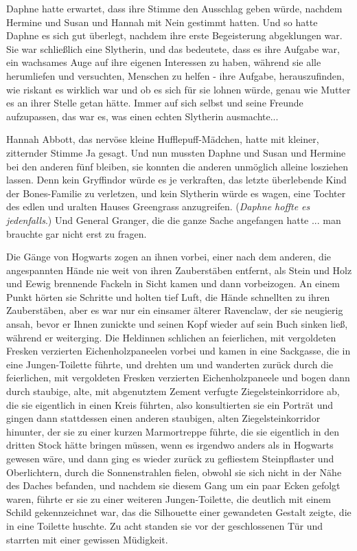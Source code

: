 Daphne hatte erwartet, dass ihre Stimme den Ausschlag geben würde, nachdem
Hermine und Susan und Hannah mit Nein gestimmt hatten. Und so hatte Daphne es
sich gut überlegt, nachdem ihre erste Begeisterung abgeklungen war. Sie war
schließlich eine Slytherin, und das bedeutete, dass es ihre Aufgabe war, ein
wachsames Auge auf ihre eigenen Interessen zu haben, während sie alle
herumliefen und versuchten, Menschen zu helfen - ihre Aufgabe, herauszufinden,
wie riskant es wirklich war und ob es sich für sie lohnen würde, genau wie
Mutter es an ihrer Stelle getan hätte. Immer auf sich selbst und seine Freunde
aufzupassen, das war es, was einen echten Slytherin ausmachte...

Hannah Abbott, das nervöse kleine Hufflepuff-Mädchen, hatte mit kleiner,
zitternder Stimme \glqq{}Ja\grqq{} gesagt. Und nun mussten Daphne und Susan und
Hermine bei den anderen fünf bleiben, sie konnten die anderen unmöglich alleine
losziehen lassen. Denn kein Gryffindor würde es je verkraften, das letzte
überlebende Kind der Bones-Familie zu verletzen, und kein Slytherin würde es
wagen, eine Tochter des edlen und uralten Hauses Greengrass anzugreifen.
(\emph{Daphne hoffte es jedenfalls}.) Und General Granger, die die ganze Sache
angefangen hatte ... man brauchte gar nicht erst zu fragen.

Die Gänge von Hogwarts zogen an ihnen vorbei, einer nach dem anderen, die
angespannten Hände nie weit von ihren Zauberstäben entfernt, als Stein und Holz
und Eewig brennende Fackeln in Sicht kamen und dann vorbeizogen. An einem Punkt
hörten sie Schritte und holten tief Luft, die Hände schnellten zu ihren
Zauberstäben, aber es war nur ein einsamer älterer Ravenclaw, der sie neugierig
ansah, bevor er Ihnen zunickte und seinen Kopf wieder auf sein Buch sinken ließ,
während er weiterging. Die Heldinnen schlichen an feierlichen, mit vergoldeten
Fresken verzierten Eichenholzpaneelen vorbei und kamen in eine Sackgasse, die in
eine Jungen-Toilette führte, und drehten um und wanderten zurück durch die
feierlichen, mit vergoldeten Fresken verzierten Eichenholzpaneele und bogen dann
durch staubige, alte, mit abgenutztem Zement verfugte Ziegelsteinkorridore ab,
die sie eigentlich in einen Kreis führten, also konsultierten sie ein Porträt
und gingen dann stattdessen einen anderen staubigen, alten Ziegelsteinkorridor
hinunter, der sie zu einer kurzen Marmortreppe führte, die sie eigentlich in den
dritten Stock hätte bringen müssen, wenn es irgendwo anders als in Hogwarts
gewesen wäre, und dann ging es wieder zurück zu gefliestem Steinpflaster und
Oberlichtern, durch die Sonnenstrahlen fielen, obwohl sie sich nicht in der Nähe
des Daches befanden, und nachdem sie diesem Gang um ein paar Ecken gefolgt
waren, führte er sie zu einer weiteren Jungen-Toilette, die deutlich mit einem
Schild gekennzeichnet war, das die Silhouette einer gewandeten Gestalt zeigte,
die in eine Toilette huschte. Zu acht standen sie vor der geschlossenen Tür und
starrten mit einer gewissen Müdigkeit.

